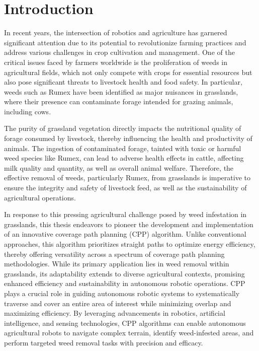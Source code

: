 \section{Introduction}

In recent years, the intersection of robotics and agriculture has garnered significant attention due to its potential to revolutionize farming practices and address various challenges in crop cultivation and management. One of the critical issues faced by farmers worldwide is the proliferation of weeds in agricultural fields, which not only compete with crops for essential resources but also pose significant threats to livestock health and food safety. In particular, weeds such as Rumex have been identified as major nuisances in grasslands, where their presence can contaminate forage intended for grazing animals, including cows.

\vspace*{6mm}

The purity of grassland vegetation directly impacts the nutritional quality of forage consumed by livestock, thereby influencing the health and productivity of animals. The ingestion of contaminated forage, tainted with toxic or harmful weed species like Rumex, can lead to adverse health effects in cattle, affecting milk quality and quantity, as well as overall animal welfare. Therefore, the effective removal of weeds, particularly Rumex, from grasslands is imperative to ensure the integrity and safety of livestock feed, as well as the sustainability of agricultural operations.

\vspace*{6mm} 


In response to this pressing agricultural challenge posed by weed infestation in grasslands, this thesis endeavors to pioneer the development and implementation of an innovative coverage path planning (CPP) algorithm. Unlike conventional approaches, this algorithm prioritizes straight paths to optimize energy efficiency, thereby offering versatility across a spectrum of coverage path planning methodologies. While its primary application lies in weed removal within grasslands, its adaptability extends to diverse agricultural contexts, promising enhanced efficiency and sustainability in autonomous robotic operations. CPP plays a crucial role in guiding autonomous robotic systems to systematically traverse and cover an entire area of interest while minimizing overlap and maximizing efficiency. By leveraging advancements in robotics, artificial intelligence, and sensing technologies, CPP algorithms can enable autonomous agricultural robots to navigate complex terrain, identify weed-infested areas, and perform targeted weed removal tasks with precision and efficacy.

